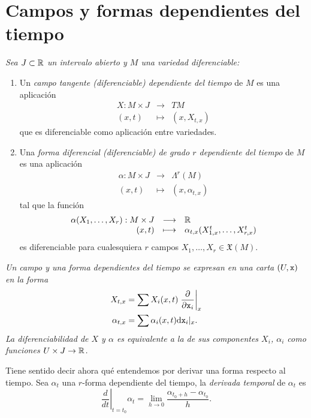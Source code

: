 \section{Campos y formas dependientes del tiempo} \label{sec:tiempo}

  \begin{defn} \leavevmode
    \em 
    Sea $ J\subset \mathbb{R} $ un intervalo abierto y $ M $ una variedad diferenciable:
    \begin{enumerate}
      \item Un \emph{campo tangente (diferenciable) dependiente del tiempo} de $M$ es una aplicación \[\begin{array}{rcl}X:M\times J & \longrightarrow & TM \\ (x,t) & \longmapsto & (x,X_{t,x}) \end{array} \] que es diferenciable como aplicación entre variedades. 
      \item Una \emph{forma diferencial (diferenciable) de grado $r$ dependiente del tiempo} de $M$ es una aplicación \[\begin{array}{rcl} \alpha: M \times J & \longrightarrow & \varLambda^r(M) \\ (x,t) &  \longmapsto & (x,\alpha_{t,x}) \end{array}\] tal que la función \[\begin{array}{rcl} \alpha(X_1,\dots,X_r):M\times J & \longrightarrow & \mathbb{R} \\ (x,t) & \longmapsto & \alpha_{t,x}(X_{1,x}^t,\dots,X_{r,x}^t)\end{array}\] es diferenciable para cualesquiera $r$ campos $X_1,\dots,X_r \in \mathfrak{X}(M)$.
    \end{enumerate}
  \end{defn}

  \begin{obs}
    \em
    Un campo y una forma dependientes del tiempo se expresan en una carta $(U,\mathtt{x})$ en la forma
    \begin{align*}
      X_{t,x} &= \sum X_i(x,t) \left.\frac{\partial}{\partial \mathtt{x}_i}\right|_x \\
      \alpha_{t,x} &= \sum \alpha_i(x,t) \mathrm{d} \mathtt{x}_i |_x.
    \end{align*}
    La diferenciabilidad de $X$ y $\alpha$ es equivalente a la de sus componentes $X_i$, $\alpha_i$ como funciones $U\times J \rightarrow \mathbb{R}$.
  \end{obs}
  Tiene sentido decir ahora qué entendemos por derivar una forma respecto al tiempo. Sea $\alpha_t$ una $r$-forma dependiente del tiempo, la \emph{derivada temporal} de $\alpha_t$ es
    \begin{equation*}
      \left. \frac{d}{dt}\right|_{t=t_0} \alpha_t = \lim_{h\rightarrow 0}\frac{\alpha_{t_0+h}-\alpha_{t_0}}{h}.
    \end{equation*}

